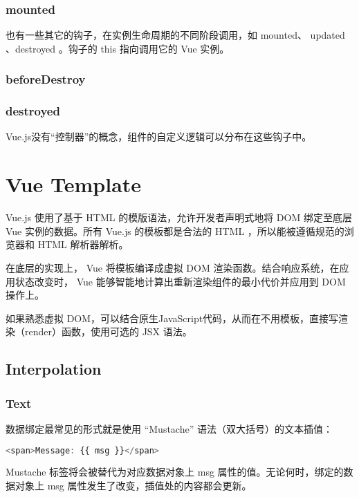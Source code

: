 \subsection{mounted}


也有一些其它的钩子，在实例生命周期的不同阶段调用，如 mounted、 updated 、destroyed 。钩子的 this 指向调用它的 Vue 实例。

\subsection{beforeDestroy}


\subsection{destroyed}



Vue.js没有“控制器”的概念，组件的自定义逻辑可以分布在这些钩子中。

\chapter{Vue Template}


Vue.js 使用了基于 HTML 的模版语法，允许开发者声明式地将 DOM 绑定至底层 Vue 实例的数据。所有 Vue.js 的模板都是合法的 HTML ，所以能被遵循规范的浏览器和 HTML 解析器解析。


在底层的实现上， Vue 将模板编译成虚拟 DOM 渲染函数。结合响应系统，在应用状态改变时， Vue 能够智能地计算出重新渲染组件的最小代价并应用到 DOM 操作上。

如果熟悉虚拟 DOM，可以结合原生JavaScript代码，从而在不用模板，直接写渲染（render）函数，使用可选的 JSX 语法。

\section{Interpolation}


\subsection{Text}

数据绑定最常见的形式就是使用 “Mustache” 语法（双大括号）的文本插值：

\begin{lstlisting}[language=JavaScript]
<span>Message: {{ msg }}</span>
\end{lstlisting}

Mustache 标签将会被替代为对应数据对象上 msg 属性的值。无论何时，绑定的数据对象上 msg 属性发生了改变，插值处的内容都会更新。





